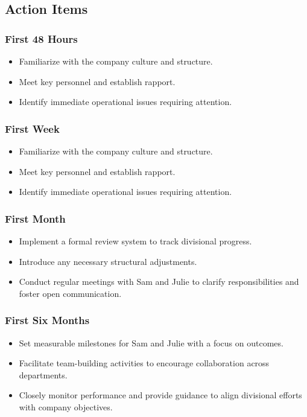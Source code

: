 \documentclass[a4paper,12pt]{article}
\begin{document}
\subsection{Action Items}

\subsubsection{First 48 Hours}
\begin{itemize}
    \item Familiarize with the company culture and structure.
    \item Meet key personnel and establish rapport.
    \item Identify immediate operational issues requiring attention.
\end{itemize}

\subsubsection{First Week}
\begin{itemize}
    \item Familiarize with the company culture and structure.
    \item Meet key personnel and establish rapport.
    \item Identify immediate operational issues requiring attention.
\end{itemize}

\subsubsection{First Month}
\begin{itemize}
    \item Implement a formal review system to track divisional progress.
    \item Introduce any necessary structural adjustments.
    \item Conduct regular meetings with Sam and Julie to clarify responsibilities and foster open communication.
\end{itemize}

\subsubsection{First Six Months}
\begin{itemize}
    \item Set measurable milestones for Sam and Julie with a focus on outcomes.
    \item Facilitate team-building activities to encourage collaboration across departments.
    \item Closely monitor performance and provide guidance to align divisional efforts with company objectives.
\end{itemize}
\end{document}
